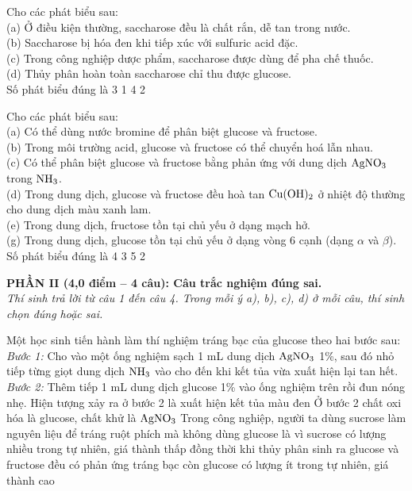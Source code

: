 \documentclass[12pt,a4paper]{article}
\begin{document}
\begin{ex}
Cho các phát biểu sau:\\
(a) Ở điều kiện thường, saccharose đều là chất rắn, dễ tan trong nước.\\
(b) Saccharose bị hóa đen khi tiếp xúc với sulfuric acid đặc.\\
(c) Trong công nghiệp dược phẩm, saccharose được dùng để pha chế thuốc.\\
(d) Thủy phân hoàn toàn saccharose chỉ thu được glucose.\\
Số phát biểu đúng là
\choice
{3}
{1}
{4}
{2}
\loigiai{}
\end{ex}

\begin{ex}
Cho các phát biểu sau:\\
(a) Có thể dùng nước bromine để phân biệt glucose và fructose.\\
(b) Trong môi trường acid, glucose và fructose có thể chuyển hoá lẫn nhau.\\
(c) Có thể phân biệt glucose và fructose bằng phản ứng với dung dịch $\ce{AgNO3}$ trong $\ce{NH3}$.\\
(d) Trong dung dịch, glucose và fructose đều hoà tan $\ce{Cu(OH)2}$ ở nhiệt độ thường cho dung dịch màu xanh lam.\\
(e) Trong dung dịch, fructose tồn tại chủ yếu ở dạng mạch hở.\\
(g) Trong dung dịch, glucose tồn tại chủ yếu ở dạng vòng 6 cạnh (dạng $\alpha$ và $\beta$).\\
Số phát biểu đúng là
\choice
{4}
{3}
{5}
{2}
\loigiai{}
\end{ex}


\vspace{0.3cm}
\noindent
\textbf{PHẦN II (4,0 điểm -- 4 câu): Câu trắc nghiệm đúng sai.}\\
\textit{Thí sinh trả lời từ câu 1 đến câu 4. Trong mỗi ý a), b), c), d) ở mỗi câu, thí sinh chọn đúng hoặc sai.}

\setcounter{ex}{0}

\begin{ex}
Một học sinh tiến hành làm thí nghiệm tráng bạc của glucose theo hai bước sau:\\
\textit{Bước 1:} Cho vào một ống nghiệm sạch 1 mL dung dịch $\ce{AgNO3}$ 1\%, sau đó nhỏ tiếp từng giọt dung dịch $\ce{NH3}$ vào cho đến khi kết tủa vừa xuất hiện lại tan hết.\\
\textit{Bước 2:} Thêm tiếp 1 mL dung dịch glucose 1\% vào ống nghiệm trên rồi đun nóng nhẹ.
{Hiện tượng xảy ra ở bước 2 là xuất hiện kết tủa màu đen}
{Ở bước 2 chất oxi hóa là glucose, chất khử là $\ce{AgNO3}$}
{Trong công nghiệp, người ta dùng sucrose làm nguyên liệu để tráng ruột phích mà không dùng glucose là vì sucrose có lượng nhiều trong tự nhiên, giá thành thấp đồng thời khi thủy phân sinh ra glucose và fructose đều có phản ứng tráng bạc còn glucose có lượng ít trong tự nhiên, giá thành cao}
\loigiai{}
\end{ex}
\end{document}
